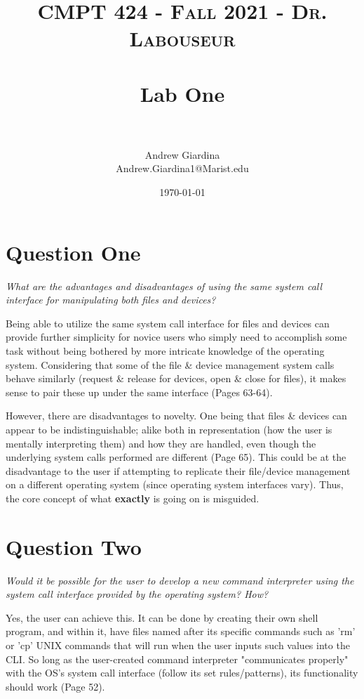 \documentclass[letterpaper, 10pt,DIV=13]{scrartcl}
\title{	
   \normalfont \normalsize 
   \textsc{CMPT 424 - Fall 2021 - Dr. Labouseur} \\[10pt] %
   \horrule{0.5pt} \\[0.25cm] 	%
   \huge Lab One  \\     	    %
   \horrule{0.5pt} \\[0.25cm] 	%
}
\author{Andrew Giardina \\ \normalsize Andrew.Giardina1@Marist.edu}
\date{\normalsize\today} 	%
\numberwithin{equation}{section} %
\numberwithin{figure}{section} %
\numberwithin{table}{section} %
\begin{document}
\maketitle %

\section{Question One}

\textit{What are	the	advantages	and	disadvantages	of	using	the	same	system	call	interface for	manipulating	both	files	and	devices?}

Being able to utilize the same system call interface for files and devices can provide further simplicity for novice users who simply need to accomplish some task without being bothered by more intricate knowledge of the operating system. Considering that some of the file \& device management system calls behave similarly (request \& release for devices, open \& close for files), it makes sense to pair these up under the same interface (Pages 63-64).

However, there are disadvantages to novelty. One being that files \& devices can appear to be indistinguishable; alike both in representation (how the user is mentally interpreting them) and how they are handled, even though the underlying system calls performed are different (Page 65). This could be at the disadvantage to the user if attempting to replicate their file/device management on a different operating system (since operating system interfaces vary). Thus, the core concept of what \textbf{exactly} is going on is misguided.

\section{Question Two}

\textit{Would	it	be	possible	for	the	user	to	develop	a	new	command	interpreter	using	the	
system	call	interface	provided	by	the	operating	system?	How?
}

Yes, the user can achieve this.  It can be done by creating their own shell program, and within it, have files named after its specific commands such as 'rm' or 'cp' UNIX commands that will run when the user inputs such values into the CLI. So long as the user-created command interpreter "communicates properly" with the OS's system call interface (follow its set rules/patterns), its functionality should work (Page 52).
\end{document}
